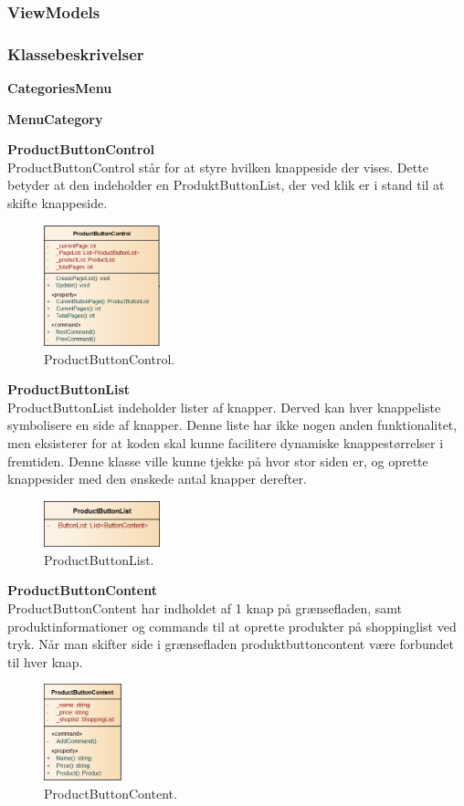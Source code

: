 \subsubsection{ViewModels}

\subsubsection{Klassebeskrivelser}
\textbf{CategoriesMenu}


\textbf{MenuCategory}

\textbf{ProductButtonControl} \\
ProductButtonControl står for at styre hvilken knappeside der vises. Dette betyder at den indeholder en ProduktButtonList, der ved klik er i stand til at skifte knappeside.

\begin{figure}[H]
	\centering
	\includegraphics[width=0.3\textwidth]{Systemdesign/Frontend/pics/ProductButtonControl}
	\caption{ProductButtonControl.}
	\label{fig:PBC}
\end{figure}

\textbf{ProductButtonList} \\
ProductButtonList indeholder lister af knapper. Derved kan hver knappeliste symbolisere en side af knapper. Denne liste har ikke nogen anden funktionalitet, men eksisterer for at koden skal kunne facilitere dynamiske knappestørrelser i fremtiden. Denne klasse ville kunne tjekke på hvor stor siden er, og oprette knappesider med den ønskede antal knapper derefter.


\begin{figure}[H]
	\centering
	\includegraphics[width=0.3\textwidth]{Systemdesign/Frontend/pics/ProductButtonList}
	\caption{ProductButtonList.}
	\label{fig:PBL}
\end{figure}

\textbf{ProductButtonContent} \\
ProductButtonContent har indholdet af 1 knap på grænsefladen, samt produktinformationer og commands til at oprette produkter på shoppinglist ved tryk. Når man skifter side i grænsefladen produktbuttoncontent være forbundet til hver knap.

\begin{figure}[H]
	\centering
	\includegraphics[width=0.2\textwidth]{Systemdesign/Frontend/pics/ProductButtonContent}
	\caption{ProductButtonContent.}
	\label{fig:PBCon}
\end{figure}




